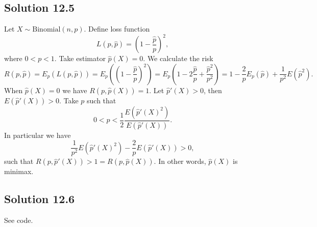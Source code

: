 \subsection*{Solution 12.5}

Let $X \sim \mathrm{Binomial}(n, p)$.
Define loss function
\begin{equation*}
    L(p, \hat{p}) = \left(1 - \frac{\hat{p}}{p}\right)^2,
\end{equation*}
where $0 < p < 1$.
Take estimator $\hat{p}(X) = 0$.
We calculate the risk
\begin{equation*}
    R(p, \hat{p}) = E_{p}(L(p, \hat{p}))
        = E_p\left(\left(1 - \frac{\hat{p}}{p}\right)^2\right)
        = E_p\left(1 - 2\frac{\hat{p}}{p} + \frac{\hat{p}^2}{p^2}\right)
        = 1 - \frac{2}{p} E_p(\hat{p}) + \frac{1}{p^2} E(\hat{p}^2).
\end{equation*}
When $\hat{p}(X) = 0$ we have $R(p, \hat{p}(X)) = 1$.
Let $\hat{p}'(X) > 0$, then $E(\hat{p}'(X)) > 0$.
Take $p$ such that
\begin{equation*}
    0 < p < \frac{1}{2} \frac{E(\hat{p}'(X)^2)}{E(\hat{p}'(X))}.
\end{equation*}
In particular we have
\begin{equation*}
    \frac{1}{p^2} E(\hat{p}'(X)^2) - \frac{2}{p} E(\hat{p}'(X)) > 0,
\end{equation*}
such that $R(p, \hat{p}'(X)) > 1 = R(p, \hat{p}(X))$.
In other words, $\hat{p}(X)$ is minimax.


\subsection*{Solution 12.6}

See code.
